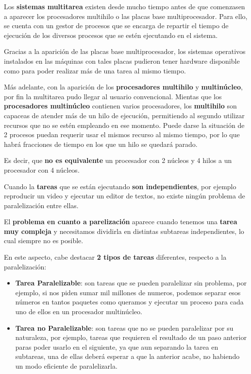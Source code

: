 Los \textbf{sistemas multitarea} existen desde mucho tiempo antes de que comenzasen a aparecer los procesadores multihilo o las placas base multiprocesador. Para ello, se cuenta con un gestor de procesos que se encarga de repartir el tiempo de ejecución de los diversos procesos que se estén ejecutando en el sistema.

Gracias a la aparición de las placas base multiprocesador, los sistemas operativos instalados en las máquinas con tales placas pudieron tener hardware disponible como para poder realizar más de una tarea al mismo tiempo.

Más adelante, con la aparición de los \textbf{procesadores multihilo} y \textbf{multinúcleo}, por fin la multitarea pudo llegar al usuario convencional. Mientas que los \textbf{procesadores multinúcleo} contienen varios procesadores, los \textbf{multihilo} son capaceas de atender más de un hilo de ejecución, permitiendo al segundo utilizar recursos que no se estén empleando en ese momento. Puede darse la situación de 2 procesos puedan requerir usar el mismos recurso al mismo tiempo, por lo que habrá fracciones de tiempo en los que un hilo se quedará parado. 

Es decir, que \textbf{no es equivalente} un procesador con 2 núcleos y 4 hilos a un procesador con 4 núcleos.

Cuando la \textbf{tareas} que se están ejecutando \textbf{son independientes}, por ejemplo reproducir un video y ejecutar un editor de textos, no existe ningún problema de paralelización entre ellas. 

El \textbf{problema en cuanto a parelización} aparece cuando tenemos una \textbf{tarea muy compleja} y necesitamos dividirla en distintas subtareas independientes, lo cual siempre no es posible. 

En este aspecto, cabe destacar \textbf{2 tipos de tareas} diferentes, respecto a la paralelización:

\begin{itemize}
	\item \textbf{Tarea Paralelizable}: son tareas que se pueden paralelizar sin problema, por ejemplo, si nos piden sumar mil millones de numeros, podemos separar esos números en tantos paquetes como queramos y ejecutar un proceso para cada uno de ellos en un procesador multinúcleo.
	
	\item \textbf{Tarea no Paralelizable}: son tareas que no se pueden paralelizar por su naturaleza, por ejemplo, tareas que requieren el resultado de un paso anterior paras poder usarlo en el siguiente, ya que aun separando la tarea en subtareas, una de ellas deberá esperar a que la anterior acabe, no habiendo un modo eficiente de paralelizarla.
\end{itemize}

